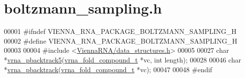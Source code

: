 \hypertarget{boltzmann__sampling_8h_source}{}\section{boltzmann\+\_\+sampling.\+h}
\label{boltzmann__sampling_8h_source}

\begin{DoxyCode}
00001 \textcolor{preprocessor}{#ifndef VIENNA\_RNA\_PACKAGE\_BOLTZMANN\_SAMPLING\_H}
00002 \textcolor{preprocessor}{#define VIENNA\_RNA\_PACKAGE\_BOLTZMANN\_SAMPLING\_H}
00003 
00004 \textcolor{preprocessor}{#include <\hyperlink{data__structures_8h}{ViennaRNA/data\_structures.h}>}
00005 
00027 \textcolor{keywordtype}{char}    *\hyperlink{group__subopt__stochbt_ga5a3e11d3ce121b5b045cb57f86a8ed05}{vrna\_pbacktrack5}(\hyperlink{group__fold__compound_structvrna__fc__s}{vrna\_fold\_compound\_t} *vc, \textcolor{keywordtype}{int} length);
00028 
00046 \textcolor{keywordtype}{char}    *\hyperlink{group__subopt__stochbt_ga0429de82e75af6c6e7508f4d273a192f}{vrna\_pbacktrack}(\hyperlink{group__fold__compound_structvrna__fc__s}{vrna\_fold\_compound\_t} *vc);
00047 
00048 \textcolor{preprocessor}{#endif}
\end{DoxyCode}
